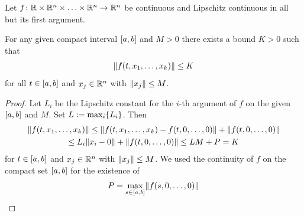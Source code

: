     \begin{lemma}\label{lm:bounded-lipschitz}
        Let $f\colon\mathbb{R}\times\mathbb{R}^n\times\ldots\times\mathbb{R}^n\to\mathbb{R}^n$ be continuous and Lipschitz continuous in all but its first argument.

        For any given compact interval $[a,b]$ and $M>0$ there exists a bound $K>0$ such that
        \begin{equation}
            \lVert f(t,x_1,\ldots,x_k)\rVert\leq K
        \end{equation}
        for all $t\in[a,b]$ and $x_j\in\mathbb{R}^n$ with $\lVert x_j\rVert\leq M$.
    \end{lemma}
    \begin{proof}
        Let $L_i$ be the Lipschitz constant for the $i$-th argument of $f$ on the given $[a,b]$ and $M$. Set $L\eqdef\max_i\set{L_i}$. Then
        \begin{multline*}
            \lVert f(t,x_1,\ldots,x_k)\rVert \leq \lVert f(t,x_1,\ldots,x_k) - f(t,0,\ldots,0)\rVert + \lVert f(t,0,\ldots,0)\rVert\\
            \leq L_i\lVert x_i-0\rVert + \lVert f(t,0,\ldots,0)\rVert \leq LM+P = K
        \end{multline*}
        for $t\in[a,b]$ and $x_j\in\mathbb{R}^n$ with $\lVert x_j\rVert\leq M$. We used the continuity of $f$ on the compact set $[a,b]$ for the existence of
        \begin{equation*}
            P = \max_{s\in[a,b]}\lVert f(s,0,\ldots,0)\rVert
        \end{equation*}
    \end{proof}

